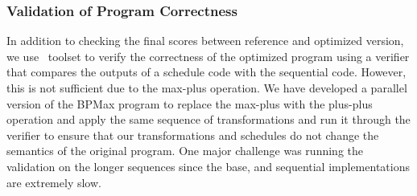\subsubsection{Validation of Program Correctness}
In addition to checking the final scores between reference and optimized version, we use \alphaz\ toolset to verify the correctness of the optimized program using a verifier that compares the outputs of a schedule code with the sequential code. However, this is not sufficient due to the max-plus operation. We have developed a parallel version of the BPMax program to replace the max-plus with the plus-plus operation and apply the same sequence of transformations and run it through the verifier to ensure that our transformations and schedules do not change the semantics of the original program. One major challenge was running the validation on the longer sequences since the base, and sequential implementations are extremely slow.
